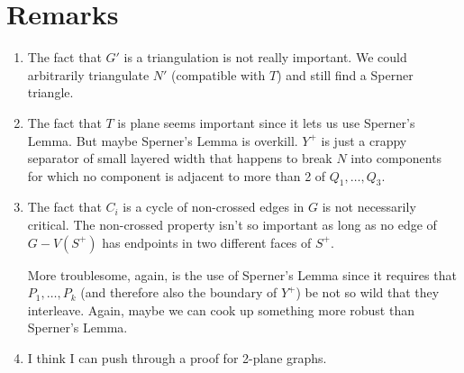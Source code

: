 \documentclass{patmorin}
\begin{document}
\section{Remarks}

\begin{enumerate}
  \item The fact that $G'$ is a triangulation is not really important. We could arbitrarily triangulate $N'$ (compatible with $T$) and still find a Sperner triangle.
  \item The fact that $T$ is plane seems important since it lets us use Sperner's Lemma.  But maybe Sperner's Lemma is overkill. $Y^+$ is just a crappy separator of small layered width that happens to break $N$ into components for which no component is adjacent to more than 2 of $Q_1,\ldots,Q_3$.
  \item The fact that $C_i$ is a cycle of non-crossed edges in $G$ is not necessarily critical.  The non-crossed property isn't so important as long as no edge of $G-V(S^+)$ has endpoints in two different faces of $S^+$.
  
  More troublesome, again, is the use of Sperner's Lemma since it requires that $P_1,\ldots,P_k$ (and therefore also the boundary of $Y^+$) be not so wild that they interleave.  Again, maybe we can cook up something more robust than Sperner's Lemma.
  
  \item I think I can push through a proof for 2-plane graphs.
\end{enumerate}



\end{document}
